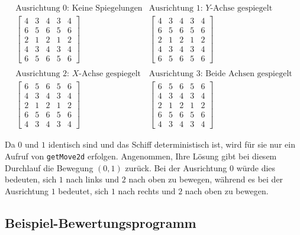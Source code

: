 \documentclass[12pt]{article}
\begin{document}
\[
\begin{array}{cc}
\text{Ausrichtung $0$: Keine Spiegelungen} & \text{Ausrichtung $1$: $Y$-Achse gespiegelt} \\
\left[
\begin{array}{ccccc}
4 & 3 & 4 & 3 & 4 \\
6 & 5 & 6 & 5 & 6 \\
2 & 1 & 2 & 1 & 2 \\
4 & 3 & 4 & 3 & 4 \\
6 & 5 & 6 & 5 & 6
\end{array}
\right]
&
\left[
\begin{array}{ccccc}
4 & 3 & 4 & 3 & 4 \\
6 & 5 & 6 & 5 & 6 \\
2 & 1 & 2 & 1 & 2 \\
4 & 3 & 4 & 3 & 4 \\
6 & 5 & 6 & 5 & 6
\end{array}
\right]
\\
\\
\text{Ausrichtung $2$: $X$-Achse gespiegelt} & \text{Ausrichtung $3$: Beide Achsen gespiegelt} \\
\left[
\begin{array}{ccccc}
6 & 5 & 6 & 5 & 6 \\
4 & 3 & 4 & 3 & 4 \\
2 & 1 & 2 & 1 & 2 \\
6 & 5 & 6 & 5 & 6 \\
4 & 3 & 4 & 3 & 4
\end{array}
\right]
&
\left[
\begin{array}{ccccc}
6 & 5 & 6 & 5 & 6 \\
4 & 3 & 4 & 3 & 4 \\
2 & 1 & 2 & 1 & 2 \\
6 & 5 & 6 & 5 & 6 \\
4 & 3 & 4 & 3 & 4
\end{array}
\right]
\end{array}
\] 

Da $0$ und $1$ identisch sind und das Schiff deterministisch ist, wird für sie nur ein Aufruf von \verb|getMove2d| erfolgen. Angenommen, Ihre Lösung gibt bei diesem Durchlauf die Bewegung $(0, 1)$ zurück. Bei der Ausrichtung $0$ würde dies bedeuten, sich $1$ nach links und $2$ nach oben zu bewegen, während es bei der Ausrichtung $1$ bedeutet, sich $1$ nach rechts und $2$ nach oben zu bewegen.

\subsection{Beispiel-Bewertungsprogramm}
\end{document}
